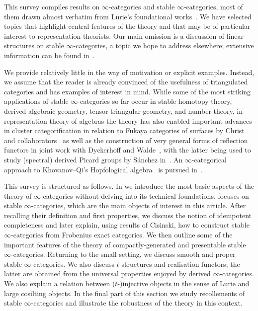 \documentclass[a4paper]{amsart}
\begin{document}
This survey compiles results on $\infty$-categories and stable
$\infty$-categories, most of them drawn almost verbatim from Lurie's
foundational works~\cite{Lur09,Lur17,Lur18SAG}. We have selected topics that
highlight central features of the theory and that may be of particular interest
to representation theorists. Our main omission is a discussion of linear
structures on stable $\infty$-categories, a topic we hope to address elsewhere;
extensive information can be found in~\cite[Appendix~D]{Lur18SAG}.

We provide relatively little in the way of motivation or explicit examples.
Instead, we assume that the reader is already convinced of the usefulness of
triangulated categories and has examples of interest in mind. While some of the
most striking applications of stable $\infty$-categories so far occur in stable
homotopy theory, derived algebraic geometry, tensor-triangular geometry, and
number theory, in representation theory of algebras the theory has also enabled
important advances in cluster categorification in relation to Fukaya categories
of surfaces by Christ and
collaborators~\cite{Chr21a,Chr22,Chr22a,CHQ23,CHQ24,Chr25a,Chr25b,Chr25} as well
as the construction of very general forms of reflection functors in joint work
with Dyckerhoff and Walde~\cite{DJW19b,DJW21}, with the latter being used to
study (spectral) derived Picard groups by S{\'a}nchez in~\cite{San25}. An
$\infty$-categorical approach to Khovanov--Qi's Hopfological algebra~\cite{Kho16,Qi14} is pursued in~\cite{GJN26}.

This survey is structured as follows. In  we introduce the most
basic aspects of the theory of $\infty$-categories without delving into its
technical foundations.  focuses on stable
$\infty$-categories, which are the main objects of interest in this article.
After recalling their definition and first properties, we discuss the notion of
idempotent completeness and later explain, using results of Cisinski, how to
construct stable $\infty$-categories from Frobenius exact categories. We then
outline some of the important features of the theory of compactly-generated and
presentable stable $\infty$-categories. Returning to the small setting, we
discuss smooth and proper stable $\infty$-categories. We also discuss
$t$-structures and realisation functors; the latter are obtained from the
universal properties enjoyed by derived $\infty$-categories. We also explain a
relation between ($t$-)injective objects in the sense of Lurie and large
cosilting objects. In the final part of this section we study recollements of
stable $\infty$-categories and illustrate the robustness of the theory in this
context.
\end{document}
